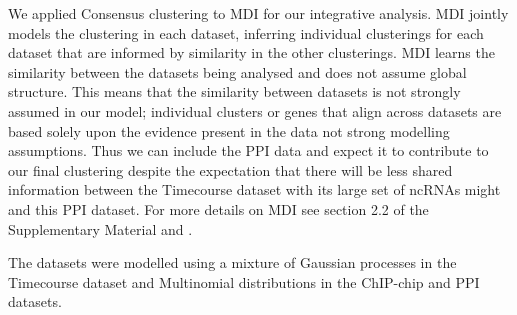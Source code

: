\documentclass{bioinfo}
\begin{document}
We applied Consensus clustering to MDI for our integrative analysis. MDI jointly models the clustering in each dataset, inferring individual clusterings for each dataset that are informed by similarity in the other clusterings. MDI learns the similarity between the datasets being analysed and does not assume global structure. This means that the similarity between datasets is not strongly assumed in our model; individual clusters or genes that align across datasets are based solely upon the evidence present in the data not strong modelling assumptions. Thus we can include the PPI data and expect it to contribute to our final clustering despite the expectation that there will be less shared information between the Timecourse dataset with its large set of ncRNAs might and this PPI dataset. For more details on MDI see section 2.2 of the Supplementary Material and \cite{kirk2012bayesian}.

The datasets were modelled using a mixture of Gaussian processes in the Timecourse dataset and Multinomial distributions in the ChIP-chip and PPI datasets. 



\end{document}
